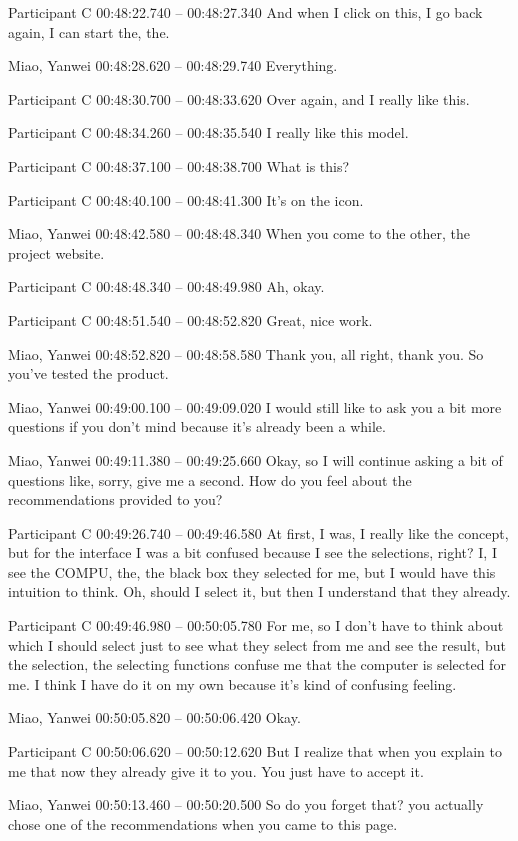{Participant C 00:48:22.740 -- 00:48:27.340
And when I click on this, I go back again, I can start the, the.

Miao, Yanwei 00:48:28.620 -- 00:48:29.740
Everything.

Participant C 00:48:30.700 -- 00:48:33.620
Over again, and I really like this.

Participant C 00:48:34.260 -- 00:48:35.540
I really like this model.

Participant C 00:48:37.100 -- 00:48:38.700
What is this?

Participant C 00:48:40.100 -- 00:48:41.300
It's on the icon.

Miao, Yanwei 00:48:42.580 -- 00:48:48.340
When you come to the other, the project website.

Participant C 00:48:48.340 -- 00:48:49.980
Ah, okay.

Participant C 00:48:51.540 -- 00:48:52.820
Great, nice work.

Miao, Yanwei 00:48:52.820 -- 00:48:58.580
Thank you, all right, thank you. So you've tested the product.

Miao, Yanwei 00:49:00.100 -- 00:49:09.020
I would still like to ask you a bit more questions if you don't mind because it's already been a while.

Miao, Yanwei 00:49:11.380 -- 00:49:25.660
Okay, so I will continue asking a bit of questions like, sorry, give me a second. How do you feel about the recommendations provided to you?

Participant C 00:49:26.740 -- 00:49:46.580
At first, I was, I really like the concept, but for the interface I was a bit confused because I see the selections, right? I, I see the COMPU, the, the black box they selected for me, but I would have this intuition to think. Oh, should I select it, but then I understand that they already.

Participant C 00:49:46.980 -- 00:50:05.780
For me, so I don't have to think about which I should select just to see what they select from me and see the result, but the selection, the selecting functions confuse me that the computer is selected for me. I think I have do it on my own because it's kind of confusing feeling.

Miao, Yanwei 00:50:05.820 -- 00:50:06.420
Okay.

Participant C 00:50:06.620 -- 00:50:12.620
But I realize that when you explain to me that now they already give it to you. You just have to accept it.

Miao, Yanwei 00:50:13.460 -- 00:50:20.500
So do you forget that? you actually chose one of the recommendations when you came to this page.

}
